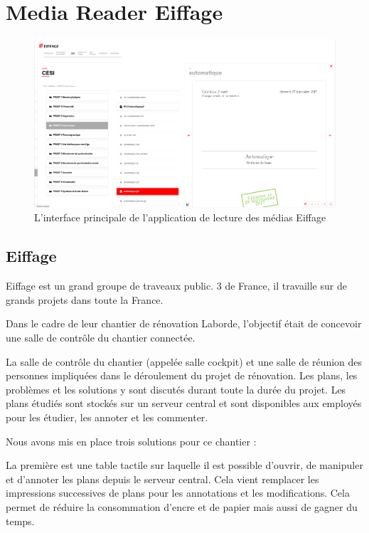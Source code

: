 \section{Media Reader Eiffage}

\begin{figure}[h]
    \centering
    \includegraphics[scale=0.5]{img/media-reader.png}
    \caption{L'interface principale de l'application de lecture des médias Eiffage}
\end{figure}

\subsection{Eiffage}

Eiffage est un grand groupe de traveaux public.
3 de France, il travaille sur de grands projets dans toute la France.

Dans le cadre de leur chantier de rénovation Laborde, l'objectif était de concevoir une salle de contrôle du chantier connectée.

La salle de contrôle du chantier (appelée salle cockpit) et une salle de réunion des personnes impliquées dans le déroulement du projet de rénovation.
Les plans, les problèmes et les solutions y sont discutés durant toute la durée du projet.
Les plans étudiés sont stockés sur un serveur central et sont disponibles aux employés pour les étudier, les annoter et les commenter.

\medskip

Nous avons mis en place trois solutions pour ce chantier :

La première est une table tactile sur laquelle il est possible d'ouvrir, de manipuler et d'annoter les plans depuis le serveur central.
Cela vient remplacer les impressions successives de plans pour les annotations et les modifications.
Cela permet de réduire la consommation d'encre et de papier mais aussi de gagner du temps.

